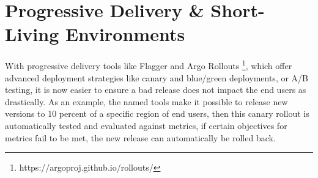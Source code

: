 \section{Progressive Delivery \& Short-Living Environments}

With progressive delivery tools like
Flagger
\autocite{flaggerWebsite}
and
Argo Rollouts
\footnote{https://argoproj.github.io/rollouts/},
which offer advanced deployment strategies
like canary and blue/green deployments, or A/B testing,
it is now easier to ensure a bad release does not impact the end users
as drastically.
As an example, the named tools make it possible to release new versions
to 10 percent of a specific region of end users,
then this canary rollout is automatically tested and evaluated against metrics,
if certain objectives for metrics fail to be met,
the new release can automatically be rolled back.

